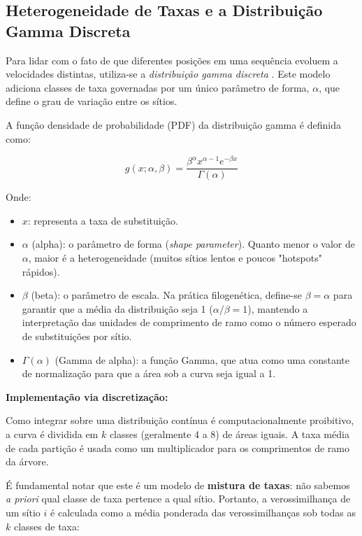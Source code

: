 \subsection{Heterogeneidade de Taxas e a Distribuição Gamma Discreta}

Para lidar com o fato de que diferentes posições em uma sequência evoluem a velocidades distintas, utiliza-se a \textit{distribuição gamma discreta} \parencite{yang1994}. Este modelo adiciona classes de taxa governadas por um único parâmetro de forma, $\alpha$, que define o grau de variação entre os sítios.

A função densidade de probabilidade (PDF) da distribuição gamma é definida como:

\begin{equation}
g(x; \alpha, \beta) = \frac{\beta^{\alpha} x^{\alpha-1} e^{-\beta x}}{\Gamma(\alpha)}
\end{equation}

Onde:
\begin{itemize}
    \item $x$: representa a taxa de substituição.
    \item $\alpha$ (alpha): o parâmetro de forma (\textit{shape parameter}). Quanto menor o valor de $\alpha$, maior é a heterogeneidade (muitos sítios lentos e poucos "hotspots" rápidos).
    \item $\beta$ (beta): o parâmetro de escala. Na prática filogenética, define-se $\beta = \alpha$ para garantir que a média da distribuição seja 1 ($\alpha/\beta = 1$), mantendo a interpretação das unidades de comprimento de ramo como o número esperado de substituições por sítio.
    \item $\Gamma(\alpha)$ (Gamma de alpha): a função Gamma, que atua como uma constante de normalização para que a área sob a curva seja igual a 1.
\end{itemize}

\textbf{Implementação via discretização:}

Como integrar sobre uma distribuição contínua é computacionalmente proibitivo, a curva é dividida em $k$ classes (geralmente 4 a 8) de áreas iguais. A taxa média de cada partição é usada como um multiplicador para os comprimentos de ramo da árvore. 

É fundamental notar que este é um modelo de \textbf{mistura de taxas}: não sabemos \textit{a priori} qual classe de taxa pertence a qual sítio. Portanto, a verossimilhança de um sítio $i$ é calculada como a média ponderada das verossimilhanças sob todas as $k$ classes de taxa:

